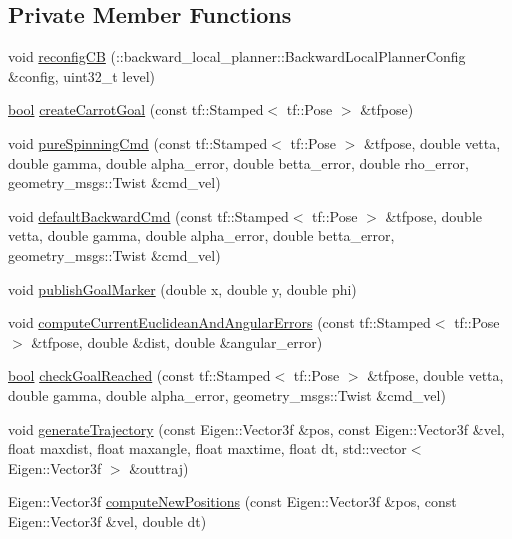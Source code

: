 \subsection*{Private Member Functions}
\begin{DoxyCompactItemize}
\item 
void \hyperlink{classcl__move__base__z_1_1backward__local__planner_1_1BackwardLocalPlanner_a62e4783adae03ce92190d855a021b91d}{reconfig\+CB} (\+::backward\+\_\+local\+\_\+planner\+::\+Backward\+Local\+Planner\+Config \&config, uint32\+\_\+t level)
\item 
\hyperlink{classbool}{bool} \hyperlink{classcl__move__base__z_1_1backward__local__planner_1_1BackwardLocalPlanner_a786337a838e58b38b724bc342cf76e10}{create\+Carrot\+Goal} (const tf\+::\+Stamped$<$ tf\+::\+Pose $>$ \&tfpose)
\item 
void \hyperlink{classcl__move__base__z_1_1backward__local__planner_1_1BackwardLocalPlanner_aaa88a0a47e7cfd449c59518577599928}{pure\+Spinning\+Cmd} (const tf\+::\+Stamped$<$ tf\+::\+Pose $>$ \&tfpose, double vetta, double gamma, double alpha\+\_\+error, double betta\+\_\+error, double rho\+\_\+error, geometry\+\_\+msgs\+::\+Twist \&cmd\+\_\+vel)
\item 
void \hyperlink{classcl__move__base__z_1_1backward__local__planner_1_1BackwardLocalPlanner_a1ebd69a028a22e3573e98f89d593f97d}{default\+Backward\+Cmd} (const tf\+::\+Stamped$<$ tf\+::\+Pose $>$ \&tfpose, double vetta, double gamma, double alpha\+\_\+error, double betta\+\_\+error, geometry\+\_\+msgs\+::\+Twist \&cmd\+\_\+vel)
\item 
void \hyperlink{classcl__move__base__z_1_1backward__local__planner_1_1BackwardLocalPlanner_a70eaeb6cf31fd3378d9fbf9bcb975995}{publish\+Goal\+Marker} (double x, double y, double phi)
\item 
void \hyperlink{classcl__move__base__z_1_1backward__local__planner_1_1BackwardLocalPlanner_a843f030138afe0a28cf11a729fa67383}{compute\+Current\+Euclidean\+And\+Angular\+Errors} (const tf\+::\+Stamped$<$ tf\+::\+Pose $>$ \&tfpose, double \&dist, double \&angular\+\_\+error)
\item 
\hyperlink{classbool}{bool} \hyperlink{classcl__move__base__z_1_1backward__local__planner_1_1BackwardLocalPlanner_a6c4363e82119a6a8a5a3bfe309280898}{check\+Goal\+Reached} (const tf\+::\+Stamped$<$ tf\+::\+Pose $>$ \&tfpose, double vetta, double gamma, double alpha\+\_\+error, geometry\+\_\+msgs\+::\+Twist \&cmd\+\_\+vel)
\item 
void \hyperlink{classcl__move__base__z_1_1backward__local__planner_1_1BackwardLocalPlanner_a9e8921ca8ce379ca8ba321f82ca23cdc}{generate\+Trajectory} (const Eigen\+::\+Vector3f \&pos, const Eigen\+::\+Vector3f \&vel, float maxdist, float maxangle, float maxtime, float dt, std\+::vector$<$ Eigen\+::\+Vector3f $>$ \&outtraj)
\item 
Eigen\+::\+Vector3f \hyperlink{classcl__move__base__z_1_1backward__local__planner_1_1BackwardLocalPlanner_a0fe2ebd23fd79e8b574127e819ef0e14}{compute\+New\+Positions} (const Eigen\+::\+Vector3f \&pos, const Eigen\+::\+Vector3f \&vel, double dt)
\end{DoxyCompactItemize}
